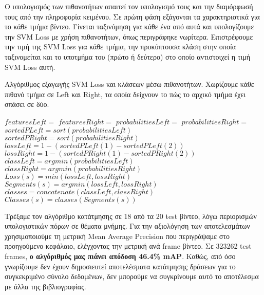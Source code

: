 \documentclass[11pt,a4paper,english,greek,twoside]{../Thesis}
\begin{document}
\par Ο υπολογισμός των πιθανοτήτων απαιτεί τον υπολογισμό τους και την διαμόρφωσή τους από την πληροφορία κειμένου. Σε πρώτη φάση εξάγονται τα χαρακτηριστικά για το κάθε τμήμα βίντεο. Γίνεται ταξινόμηση για κάθε ένα από αυτά και υπολογίζουμε την SVM Loss με χρήση πιθανοτήτων, όπως περιγράφηκε νωρίτερα. Επιστρέφουμε την τιμή της SVM Loss για κάθε τμήμα, την προκύπτουσα κλάση στην οποία ταξινομείται και το υποτμήμα του (πρώτο ή δεύτερο) στο οποίο αντιστοιχεί η τιμή SVM Loss αυτή.

\begin{algorithm}[H]
	\caption{Αλγόριθμος εξαγωγής SVM Loss και κλάσεων μέσω πιθανοτήτων. Χωρίζουμε κάθε πιθανό τμήμα σε Left και Right, τα οποία δείχνουν το πώς το αρχικό τμήμα έχει σπάσει σε δύο.}
	\label{alg:Probs}
	\begin{algorithmic}
		\State $featuresLeft=$ \Call{extractFeatures}{$[segment(1), segment(s))$}
		\State $featuresRight=$ \Call{extractFeatures}{$[segment(s), segments(end))$}
		\State $probabilitiesLeft=$ 
		\State $probabilitiesRight=$ 
		\State $sortedPLeft=sort(probabilitiesLeft)$
		\State $sortedPRight=sort(probabilitiesRight)$
		\State $lossLeft=1-(sortedPLeft(1)-sortedPLeft(2))$
		\State $lossRight=1-(sortedPRight(1)-sortedPRight(2))$
		\State $classLeft=argmin(probabilitiesLeft)$
		\State $classRight=argmin(probabilitiesRight)$
		\State $Loss(s)=min(lossLeft,lossRight)$
		\State $Segments(s)=argmin(lossLeft, lossRight)$
		\State $classes=concatenate(classLeft, classRight)$
		\State $Classes(s)=classes(Segments(s))$
	  \EndFor
	  \EndFunction
	\end{algorithmic}
\end{algorithm}

\par Τρέξαμε τον αλγόριθμο κατάτμησης σε 18 από τα 20 test βίντεο, λόγω περιορισμών υπολογιστικών πόρων σε θέματα μνήμης. Για την αξιολόγηση των αποτελεσμάτων χρησιμοποιούμε τη μετρική Mean Average Precision που περιγράψαμε στο προηγούμενο κεφάλαιο, ελέγχοντας την μετρική ανά frame βίντεο. Σε 323262 test frames, \textbf{ο αλγόριθμός μας πιάνει απόδοση 46.4\% mAP}. Καθώς, από όσο γνωρίζουμε δεν έχουν δημοσιευτεί αποτελέσματα κατάτμησης δράσεων για το συγκεκριμένο σύνολο δεδομένων, δεν μπορούμε να συγκρίνουμε αυτό το αποτέλεσμα με άλλα της βιβλιογραφίας.
\end{document}
